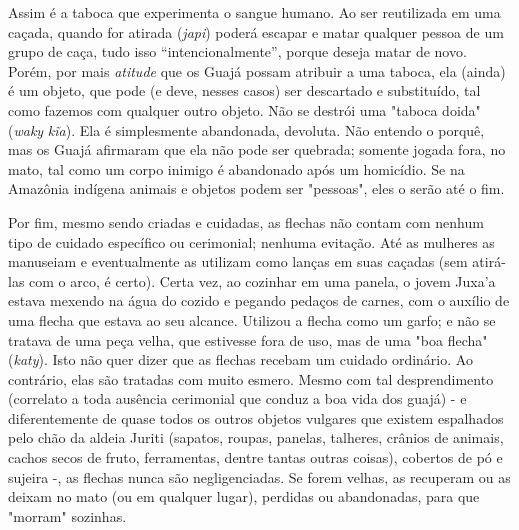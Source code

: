 Assim é a taboca que experimenta o sangue humano. Ao ser reutilizada em
uma caçada, quando for atirada (\emph{japi}) poderá escapar e matar
qualquer pessoa de um grupo de caça, tudo isso ``intencionalmente'',
porque deseja matar de novo. Porém, por mais \emph{atitude} que os Guajá
possam atribuir a uma taboca, ela (ainda) é um objeto, que pode (e deve,
nesses casos) ser descartado e substituído, tal como fazemos com
qualquer outro objeto. Não se destrói uma "taboca doida" (\emph{waky}
\emph{kĩa}). Ela é simplesmente abandonada, devoluta. Não entendo o
porquê, mas os Guajá afirmaram que ela não pode ser quebrada; somente
jogada fora, no mato, tal como um corpo inimigo é abandonado após um
homicídio. Se na Amazônia indígena animais e objetos podem ser
"pessoas", eles o serão até o fim.

Por fim, mesmo sendo criadas e cuidadas, as flechas não contam com
nenhum tipo de cuidado específico ou cerimonial; nenhuma evitação. Até
as mulheres as manuseiam e eventualmente as utilizam como lanças em suas
caçadas (sem atirá-las com o arco, é certo). Certa vez, ao cozinhar em
uma panela, o jovem Juxa'a estava mexendo na água do cozido e pegando
pedaços de carnes, com o auxílio de uma flecha que estava ao seu
alcance. Utilizou a flecha como um garfo; e não se tratava de uma peça
velha, que estivesse fora de uso, mas de uma "boa flecha" (\emph{katy}).
Isto não quer dizer que as flechas recebam um cuidado ordinário. Ao
contrário, elas são tratadas com muito esmero. Mesmo com tal
desprendimento (correlato a toda ausência cerimonial que conduz a boa
vida dos guajá) - e diferentemente de quase todos os outros objetos
vulgares que existem espalhados pelo chão da aldeia Juriti (sapatos,
roupas, panelas, talheres, crânios de animais, cachos secos de fruto,
ferramentas, dentre tantas outras coisas), cobertos de pó e sujeira -,
as flechas nunca são negligenciadas. Se forem velhas, as recuperam ou as
deixam no mato (ou em qualquer lugar), perdidas ou abandonadas, para que
"morram" sozinhas.
